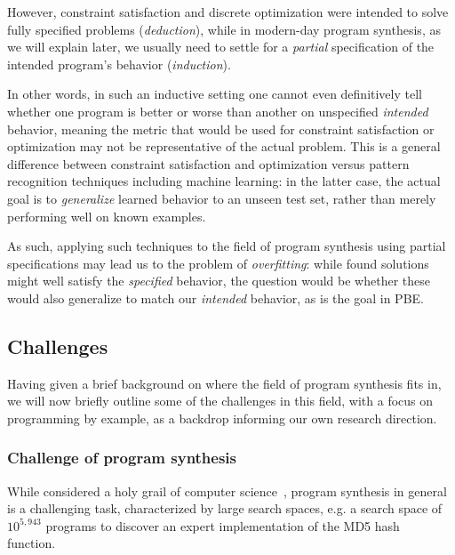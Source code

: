\documentclass{article}
\begin{document}
However, constraint satisfaction and discrete optimization were intended to solve fully specified problems (\emph{deduction}),
while in modern-day program synthesis, as we will explain later,
we usually need to settle for a \emph{partial} specification of the intended program's behavior (\emph{induction}).

In other words, in such an inductive setting one cannot even definitively tell whether one program is better or worse than another on unspecified \emph{intended} behavior,
meaning the metric that would be used for constraint satisfaction or optimization may not be representative of the actual problem.
This is a general difference between constraint satisfaction and optimization versus pattern recognition techniques including machine learning:
in the latter case, the actual goal is to \emph{generalize} learned behavior to an unseen test set,
rather than merely performing well on known examples.

As such, applying such techniques to the field of program synthesis using partial specifications may lead us to the problem of \emph{overfitting}:
while found solutions might well satisfy the \emph{specified} behavior,
the question would be whether these would also generalize to match our \emph{intended} behavior,
as is the goal in PBE.

\subsection{Challenges}

Having given a brief background on where the field of program synthesis fits in,
we will now briefly outline some of the challenges in this field,
with a focus on programming by example,
as a backdrop informing our own research direction.

\subsubsection{Challenge of program synthesis}

While considered a holy grail of computer science~\citep{gulwani2017program},
program synthesis in general is a challenging task, characterized by large search spaces,
e.g. a search space of $10^{5,943}$ programs to discover an expert implementation of the MD5 hash function.~\cite{gulwani2017program}
\end{document}
